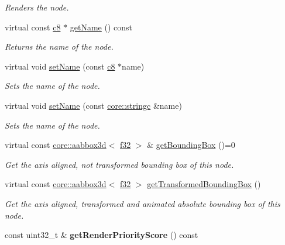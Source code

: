 \begin{DoxyCompactItemize}
\begin{DoxyCompactList}\small\item\em Renders the node. \end{DoxyCompactList}\item 
virtual const \hyperlink{namespaceirr_a9395eaea339bcb546b319e9c96bf7410}{c8} $\ast$ \hyperlink{classirr_1_1scene_1_1ISceneNode_aabb3b657d0afb62994399181b952f3e3}{get\+Name} () const 
\begin{DoxyCompactList}\small\item\em Returns the name of the node. \end{DoxyCompactList}\item 
virtual void \hyperlink{classirr_1_1scene_1_1ISceneNode_a810a54a2fc178b9a0e731513865f67d0}{set\+Name} (const \hyperlink{namespaceirr_a9395eaea339bcb546b319e9c96bf7410}{c8} $\ast$name)
\begin{DoxyCompactList}\small\item\em Sets the name of the node. \end{DoxyCompactList}\item 
virtual void \hyperlink{classirr_1_1scene_1_1ISceneNode_a20a22d956974f4817a20663361f20042}{set\+Name} (const \hyperlink{namespaceirr_1_1core_ade1071a878633f2f6d8a75c5d11fec19}{core\+::stringc} \&name)
\begin{DoxyCompactList}\small\item\em Sets the name of the node. \end{DoxyCompactList}\item 
virtual const \hyperlink{classirr_1_1core_1_1aabbox3d}{core\+::aabbox3d}$<$ \hyperlink{namespaceirr_a0277be98d67dc26ff93b1a6a1d086b07}{f32} $>$ \& \hyperlink{classirr_1_1scene_1_1ISceneNode_a327b73e3ae6faafa63e4767e338425f5}{get\+Bounding\+Box} ()=0
\begin{DoxyCompactList}\small\item\em Get the axis aligned, not transformed bounding box of this node. \end{DoxyCompactList}\item 
virtual const \hyperlink{classirr_1_1core_1_1aabbox3d}{core\+::aabbox3d}$<$ \hyperlink{namespaceirr_a0277be98d67dc26ff93b1a6a1d086b07}{f32} $>$ \hyperlink{classirr_1_1scene_1_1ISceneNode_a23f1bf45efcca008816f3e05a52e4994}{get\+Transformed\+Bounding\+Box} ()
\begin{DoxyCompactList}\small\item\em Get the axis aligned, transformed and animated absolute bounding box of this node. \end{DoxyCompactList}\item 
const uint32\+\_\+t \& {\bfseries get\+Render\+Priority\+Score} () const \hypertarget{classirr_1_1scene_1_1ISceneNode_ae5eb0b83ed427f138f9e3a2c519b9adb}{}\label{classirr_1_1scene_1_1ISceneNode_ae5eb0b83ed427f138f9e3a2c519b9adb}


\end{DoxyCompactItemize}
